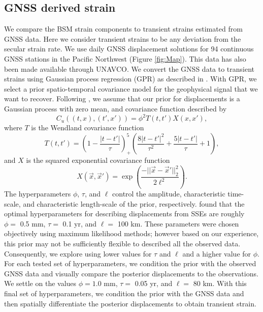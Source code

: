 \subsection{GNSS derived strain}
We compare the BSM strain components to transient strains estimated
from GNSS data. Here we consider transient strains to be any deviation
from the secular strain rate.  We use daily GNSS displacement
solutions for 94 continuous GNSS stations in the Pacific Northwest
(Figure \ref{fig:Map}). This data has also been made available through
UNAVCO. We convert the GNSS data to transient strains using Gaussian
process regression (GPR) as described in \citet{Hines2017a}. With GPR,
we select a prior spatio-temporal covariance model for the geophysical
signal that we want to recover. Following \citet{Hines2017a}, we
assume that our prior for displacements is a Gaussian process with
zero mean, and covariance function described by
\begin{equation}\label{cov}
C_u((t,x),(t',x')) = \phi^2 T(t,t')X(x,x'),
\end{equation}        
where $T$ is the Wendland covariance function
\begin{equation}\label{eq:Wendland}
T(t,t') = \left(1 - \frac{|t - t'|}{\tau}\right)^5_+ \left(\frac{8|t - t'|^2}{\tau^2} + \frac{5|t - t'|}{\tau} + 1\right), 
\end{equation}
and $X$ is the squared exponential covariance function
\begin{equation}\label{eq:SE}
X(\vec{x},\vec{x}') = \exp\left(\frac{-||\vec{x} - \vec{x}'||_2^2}{2 \ell^2}\right).
\end{equation}
The hyperparameters $\phi$, $\tau$, and $\ell$ control the amplitude,
characteristic time-scale, and characteristic length-scale of the
prior, respectively. \citet{Hines2017a} found that the optimal
hyperparameters for describing displacements from SSEs are roughly
$\phi =$ 0.5 mm, $\tau =$ 0.1 yr, and $\ell =$ 100 km. These
parameters were chosen objectively using maximum likelihood methods;
however based on our experience, this prior may not be sufficiently
flexible to described all the observed data. Consequently, we explore
using lower values for $\tau$ and $\ell$ and a higher value for
$\phi$. For each tested set of hyperparameters, we condition the prior
with the observed GNSS data and visually compare the posterior
displacements to the observations. We settle on the values $\phi =
1.0$ mm, $\tau =$ 0.05 yr, and $\ell =$ 80 km. With this final set of
hyperparameters, we condition the prior with the GNSS data and then
spatially differentiate the posterior displacements to obtain
transient strain.

